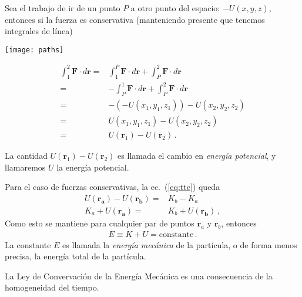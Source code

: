 Sea el trabajo de ir de un punto $P$ a otro punto del espacio: $-U(x,y,z)$, entonces si la fuerza es conservativa (manteniendo presente que tenemos integrales de línea)

\begin{minipage}{0.5\linewidth}
\texttt{[image: paths]}  
\end{minipage}
\begin{minipage}{0.5\linewidth}
  \begin{align}
  \int_1^2 \mathbf{F}\cdot d\mathbf{r}
  =&\int_1^P \mathbf{F}\cdot d\mathbf{r}+\int_P^2 \mathbf{F}\cdot d\mathbf{r}\nonumber\\
  =&-\int_P^1 \mathbf{F}\cdot d\mathbf{r}+\int_P^2 \mathbf{F}\cdot d\mathbf{r}\nonumber\\
  =&-(-U(x_1,y_1,z_1))-U(x_2,y_2,z_2)\nonumber\\
  =&U(x_1,y_1,z_1)-U(x_2,y_2,z_2)\nonumber\\
  =&U(\mathbf{r}_1)-U(\mathbf{r}_2)\,.
\end{align}
\end{minipage}

La cantidad $U(\mathbf{r}_1)-U(\mathbf{r}_2)$ es llamada el cambio en \emph{energía potencial}, y llamaremos $U$ la energía potencial.

Para el caso de fuerzas conservativas, la ec.~(\ref{eq:tte}) queda
\begin{align}
  U(\mathbf{r_a})-U(\mathbf{r_b})=&K_b-K_a\nonumber\\
  K_a+U(\mathbf{r_a})=&K_b+U(\mathbf{r_b})\,,
\end{align}
Como esto se mantiene para cualquier par de puntos $\mathbf{r}_a$ y $\mathbf{r}_b$, entonces
\begin{align}
  E\equiv K+U=\text{constante}\,.
\end{align}
La constante $E$ es llamada la \emph{energía mecánica} de la partícula, o de forma menos precisa, la energía total de la partícula. 

La Ley de Convervación de la Energía Mecánica es una consecuencia de la homogeneidad del tiempo.

